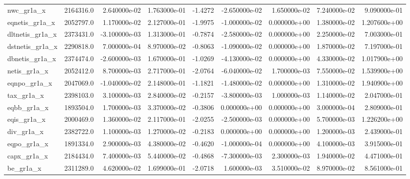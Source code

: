\documentclass[10pt]{article}
\begin{document}
\begin{landscape}
\begin{longtable}{|l|r|r|r|r|r|r|r|r|}
nwc\_gr1a\_x              &  2164316.0 &  2.640000e-02 &  1.763000e-01 &     -1.4272 & -2.650000e-02 &  1.650000e-02 &  7.240000e-02 &  9.090000e-01 \\
eqnetis\_gr1a\_x          &  2052797.0 &  1.170000e-02 &  2.127000e-01 &     -1.9975 & -1.000000e-02 &  0.000000e+00 &  1.380000e-02 &  1.207600e+00 \\
dltnetis\_gr1a\_x         &  2373431.0 & -3.100000e-03 &  1.313000e-01 &     -0.7874 & -2.580000e-02 &  0.000000e+00 &  2.250000e-02 &  7.003000e-01 \\
dstnetis\_gr1a\_x         &  2290818.0 &  7.000000e-04 &  8.970000e-02 &     -0.8063 & -1.090000e-02 &  0.000000e+00 &  1.870000e-02 &  7.197000e-01 \\
dbnetis\_gr1a\_x          &  2374474.0 & -2.600000e-03 &  1.670000e-01 &     -1.0269 & -4.130000e-02 &  0.000000e+00 &  4.330000e-02 &  1.017900e+00 \\
netis\_gr1a\_x            &  2052412.0 &  8.700000e-03 &  2.717000e-01 &     -2.0764 & -6.040000e-02 &  1.700000e-03 &  7.550000e-02 &  1.539900e+00 \\
eqnpo\_gr1a\_x            &  2047069.0 & -1.040000e-02 &  2.148000e-01 &     -1.1821 & -1.480000e-02 &  0.000000e+00 &  1.310000e-02 &  1.940900e+00 \\
tax\_gr1a\_x              &  2398103.0 &  3.100000e-03 &  2.840000e-02 &     -0.2157 & -3.800000e-03 &  1.000000e-03 &  1.140000e-02 &  2.047000e-01 \\
eqbb\_gr1a\_x             &  1893504.0 &  1.700000e-03 &  3.370000e-02 &     -0.3806 &  0.000000e+00 &  0.000000e+00 &  3.000000e-04 &  2.809000e-01 \\
eqis\_gr1a\_x             &  2000469.0 &  1.360000e-02 &  2.117000e-01 &     -2.0255 & -2.500000e-03 &  0.000000e+00 &  5.700000e-03 &  1.226200e+00 \\
div\_gr1a\_x              &  2382722.0 &  1.100000e-03 &  1.270000e-02 &     -0.2183 &  0.000000e+00 &  0.000000e+00 &  1.200000e-03 &  2.439000e-01 \\
eqpo\_gr1a\_x             &  1891334.0 &  2.900000e-03 &  4.380000e-02 &     -0.4620 & -1.000000e-04 &  0.000000e+00 &  4.100000e-03 &  3.915000e-01 \\
capx\_gr1a\_x             &  2184434.0 &  7.400000e-03 &  5.440000e-02 &     -0.4868 & -7.300000e-03 &  2.300000e-03 &  1.940000e-02 &  4.471000e-01 \\
be\_gr1a\_x               &  2311289.0 &  4.620000e-02 &  1.699000e-01 &     -2.0718 &  1.600000e-03 &  3.510000e-02 &  8.970000e-02 &  8.561000e-01 \\

\end{longtable}
\end{landscape}
\end{document}
